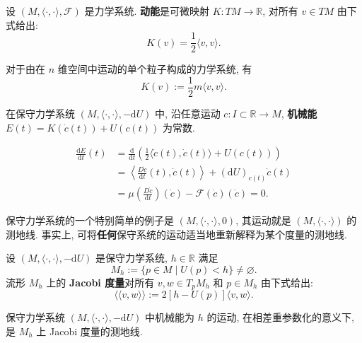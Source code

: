 \begin{RiemannDefinition}\label{def:kinetic-energy-of-mechanical-system}
设 $(M,\langle\cdot,\cdot\rangle,\mathcal{F})$ 是力学系统. \textbf{动能}是可微映射 $K:TM\to\mathbb{R}$, 对所有 $v\in TM$ 由下式给出:
\[
  K(v)=\frac12\langle v,v\rangle.
\]
\end{RiemannDefinition}

\begin{RiemannExample}\label{ex:kinetic-energy-of-single-particle}
对于由在 $n$ 维空间中运动的单个粒子构成的力学系统, 有
\[
  K(v):=\frac12m\langle v,v\rangle.
\]
\end{RiemannExample}

\begin{RiemannTheorem}[能量守恒]\label{thm:conservation-of-mechanical-energy}
在保守力学系统 $(M,\langle\cdot,\cdot\rangle,-\mathrm{d}U)$ 中, 沿任意运动 $c:I\subset\mathbb{R}\to M$, \textbf{机械能} $E(t)=K(\dot c(t))+U(c(t))$ 为常数.
\end{RiemannTheorem}

\begin{RiemannProof}
\begin{align*}
  \frac{\mathrm{d}E}{\mathrm{d}t}(t)
  &=\frac{\mathrm{d}}{\mathrm{d}t}\left(\frac12\langle\dot c(t),\dot c(t)\rangle+U(c(t))\right)\\
  &=\left\langle\frac{D\dot c}{\mathrm{d}t}(t),\dot c(t)\right\rangle+(\mathrm{d}U)_{c(t)}\dot c(t)\\
  &=\mu\left(\frac{D\dot c}{\mathrm{d}t}\right)(\dot c)-\mathcal{F}(\dot c)(\dot c)=0.
\end{align*}
\end{RiemannProof}

保守力学系统的一个特别简单的例子是 $(M,\langle\cdot,\cdot\rangle,0)$, 其运动就是 $(M,\langle\cdot,\cdot\rangle)$ 的测地线. 事实上, 可将\textbf{任何}保守系统的运动适当地重新解释为某个度量的测地线.

\begin{RiemannDefinition}\label{def:jacobi-metric}
设 $(M,\langle\cdot,\cdot\rangle,-\mathrm{d}U)$ 是保守力学系统, $h\in\mathbb{R}$ 满足
\[
  M_h:=\{p\in M\mid U(p)<h\}\ne\varnothing.
\]
流形 $M_h$ 上的 \textbf{Jacobi 度量}对所有 $v,w\in T_pM_h$ 和 $p\in M_h$ 由下式给出:
\[
  \langle\!\langle v,w\rangle\!\rangle:=2[h-U(p)]\langle v,w\rangle.
\]
\end{RiemannDefinition}

\begin{RiemannTheorem}[Jacobi]\label{thm:jacobi-geodesics-as-mechanical-motion}
保守力学系统 $(M,\langle\cdot,\cdot\rangle,-\mathrm{d}U)$ 中机械能为 $h$ 的运动, 在相差重参数化的意义下, 是 $M_h$ 上 Jacobi 度量的测地线.
\end{RiemannTheorem}


